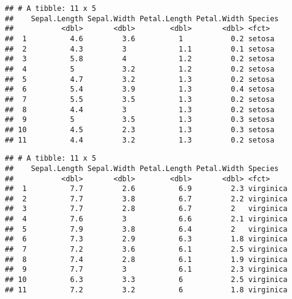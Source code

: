 \documentclass[]{book}
\newenvironment{Shaded}{\begin{snugshade}}{\end{snugshade}}
\newcommand{\DataTypeTok}[1]{\textcolor[rgb]{0.13,0.29,0.53}{#1}}
\newcommand{\DecValTok}[1]{\textcolor[rgb]{0.00,0.00,0.81}{#1}}
\newcommand{\KeywordTok}[1]{\textcolor[rgb]{0.13,0.29,0.53}{\textbf{#1}}}
\newcommand{\NormalTok}[1]{#1}
\newcommand{\OperatorTok}[1]{\textcolor[rgb]{0.81,0.36,0.00}{\textbf{#1}}}
\newcommand{\StringTok}[1]{\textcolor[rgb]{0.31,0.60,0.02}{#1}}
\begin{document}
\begin{Shaded}
\end{Shaded}

\begin{verbatim}
## # A tibble: 11 x 5
##    Sepal.Length Sepal.Width Petal.Length Petal.Width Species
##           <dbl>       <dbl>        <dbl>       <dbl> <fct>  
##  1          4.6         3.6          1           0.2 setosa 
##  2          4.3         3            1.1         0.1 setosa 
##  3          5.8         4            1.2         0.2 setosa 
##  4          5           3.2          1.2         0.2 setosa 
##  5          4.7         3.2          1.3         0.2 setosa 
##  6          5.4         3.9          1.3         0.4 setosa 
##  7          5.5         3.5          1.3         0.2 setosa 
##  8          4.4         3            1.3         0.2 setosa 
##  9          5           3.5          1.3         0.3 setosa 
## 10          4.5         2.3          1.3         0.3 setosa 
## 11          4.4         3.2          1.3         0.2 setosa
\end{verbatim}

\begin{Shaded}
\end{Shaded}

\begin{verbatim}
## # A tibble: 11 x 5
##    Sepal.Length Sepal.Width Petal.Length Petal.Width Species  
##           <dbl>       <dbl>        <dbl>       <dbl> <fct>    
##  1          7.7         2.6          6.9         2.3 virginica
##  2          7.7         3.8          6.7         2.2 virginica
##  3          7.7         2.8          6.7         2   virginica
##  4          7.6         3            6.6         2.1 virginica
##  5          7.9         3.8          6.4         2   virginica
##  6          7.3         2.9          6.3         1.8 virginica
##  7          7.2         3.6          6.1         2.5 virginica
##  8          7.4         2.8          6.1         1.9 virginica
##  9          7.7         3            6.1         2.3 virginica
## 10          6.3         3.3          6           2.5 virginica
## 11          7.2         3.2          6           1.8 virginica
\end{verbatim}
\end{document}
